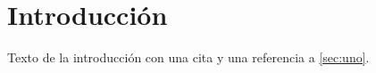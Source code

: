 \documentclass{article}
\begin{document}
\section{Introducción}\label{sec:intro}
Texto de la introducción con una cita \cite{knuth84} y una referencia a \ref{sec:uno}.


\printbibliography
\end{document}
